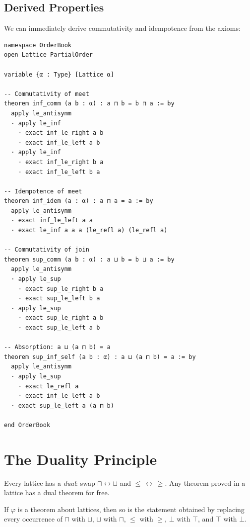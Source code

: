 \documentclass[12pt, a4paper, openright]{book}
\theoremstyle{thmstyle}
\theoremstyle{defstyle}
\newenvironment{thmbox}[1][]{%
  \begin{tcolorbox}[thmbox, title={\ifx\\#1\\Theorem\else#1\fi}]%
}{\end{tcolorbox}}
\begin{document}
\subsection{Derived Properties}

We can immediately derive commutativity and idempotence from the axioms:

\begin{verbatim}
namespace OrderBook
open Lattice PartialOrder

variable {α : Type} [Lattice α]

-- Commutativity of meet
theorem inf_comm (a b : α) : a ⊓ b = b ⊓ a := by
  apply le_antisymm
  · apply le_inf
    · exact inf_le_right a b
    · exact inf_le_left a b
  · apply le_inf
    · exact inf_le_right b a
    · exact inf_le_left b a

-- Idempotence of meet
theorem inf_idem (a : α) : a ⊓ a = a := by
  apply le_antisymm
  · exact inf_le_left a a
  · exact le_inf a a a (le_refl a) (le_refl a)

-- Commutativity of join
theorem sup_comm (a b : α) : a ⊔ b = b ⊔ a := by
  apply le_antisymm
  · apply le_sup
    · exact sup_le_right b a
    · exact sup_le_left b a
  · apply le_sup
    · exact sup_le_right a b
    · exact sup_le_left a b

-- Absorption: a ⊔ (a ⊓ b) = a
theorem sup_inf_self (a b : α) : a ⊔ (a ⊓ b) = a := by
  apply le_antisymm
  · apply le_sup
    · exact le_refl a
    · exact inf_le_left a b
  · exact sup_le_left a (a ⊓ b)

end OrderBook
\end{verbatim}

\section{The Duality Principle}

Every lattice has a \emph{dual}: swap $\sqcap \leftrightarrow \sqcup$ and
$\leq\, \leftrightarrow\, \geq$. Any theorem proved in a lattice has a dual
theorem for free.

\begin{thmbox}[Duality Principle]
  If $\varphi$ is a theorem about lattices, then so is the statement obtained
  by replacing every occurrence of $\sqcap$ with $\sqcup$, $\sqcup$ with $\sqcap$,
  $\leq$ with $\geq$, $\bot$ with $\top$, and $\top$ with $\bot$.
\end{thmbox}
\end{document}
